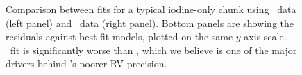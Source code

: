 \begin{figure}
\centering
{}
\caption{Comparison between fits for a typical iodine-only chunk using
  \het\ data (left panel) and \keck\ data (right panel). Bottom panels
  are showing the residuals against best-fit models, plotted on the
  same $y$-axis scale. \het\ fit is significantly worse than \keck,
  which we believe is one of the major drivers behind \het's poorer RV
  precision. 
\label{het:fig:iodchunkcomp}}
\end{figure}


